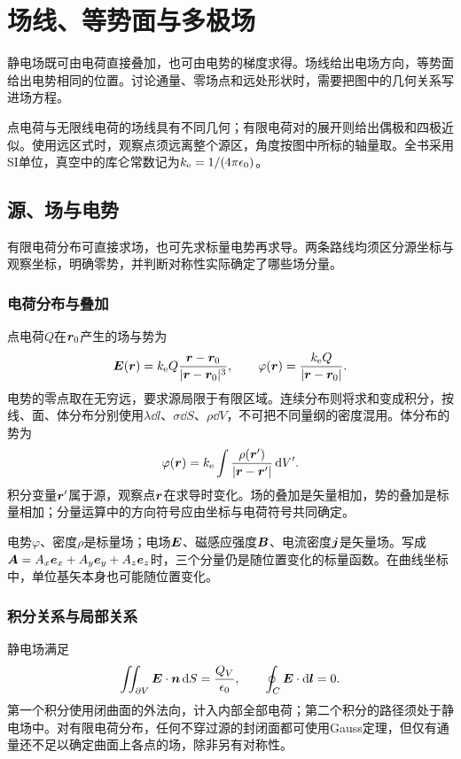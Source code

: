\chapter{场线、等势面与多极场}\label{ch:es1}

静电场既可由电荷直接叠加，也可由电势的梯度求得。场线给出电场方向，等势面给出电势相同的位置。讨论通量、零场点和远处形状时，需要把图中的几何关系写进场方程。

点电荷与无限线电荷的场线具有不同几何；有限电荷对的展开则给出偶极和四极近似。使用远区式时，观察点须远离整个源区，角度按图中所标的轴量取。全书采用SI单位，真空中的库仑常数记为$k_{\rm e}=1/(4\pi\epsilon_0)$。


\section{源、场与电势}\label{sec:es1-foundation}
有限电荷分布可直接求场，也可先求标量电势再求导。两条路线均须区分源坐标与观察坐标，明确零势，并判断对称性实际确定了哪些场分量。

\subsection{电荷分布与叠加}
点电荷$Q$在$\bm{r}_0$产生的场与势为
\[\bm{E}(\bm{r})=k_{\rm e} Q\frac{\bm{r}-\bm{r}_0}{|\bm{r}-\bm{r}_0|^3},\qquad
\varphi(\bm{r})=\frac{k_{\rm e} Q}{|\bm{r}-\bm{r}_0|}.\]
电势的零点取在无穷远，要求源局限于有限区域。连续分布则将求和变成积分，按线、面、体分布分别使用$\lambda\dd l$、$\sigma\dd S$、$\rho\dd V$，不可把不同量纲的密度混用。体分布的势为
\[\varphi(\bm{r})=k_{\rm e}\int\frac{\rho(\bm{r}')}{|\bm{r}-\bm{r}'|}\mathop{}\!\mathrm d V'.\]
积分变量$\bm{r}'$属于源，观察点$\bm{r}$在求导时变化。场的叠加是矢量相加，势的叠加是标量相加；分量运算中的方向符号应由坐标与电荷符号共同确定。

电势$\varphi$、密度$\rho$是标量场；电场$\bm{E}$、磁感应强度$\bm{B}$、电流密度$\bm{j}$是矢量场。写成$\bm{A}=A_x\bm{e}_x+A_y\bm{e}_y+A_z\bm{e}_z$时，三个分量仍是随位置变化的标量函数。在曲线坐标中，单位基矢本身也可能随位置变化。

\subsection{积分关系与局部关系}
静电场满足
\[\iint_{\partial V}\bm{E}\cdot\bm{n}\mathop{}\!\mathrm d S=\frac{Q_V}{\epsilon_0},\qquad
\oint_C\bm{E}\cdot\mathop{}\!\mathrm d\bm{l}=0.\]
第一个积分使用闭曲面的外法向，计入内部全部电荷；第二个积分的路径须处于静电场中。对有限电荷分布，任何不穿过源的封闭面都可使用Gauss定理，但仅有通量还不足以确定曲面上各点的场，除非另有对称性。

